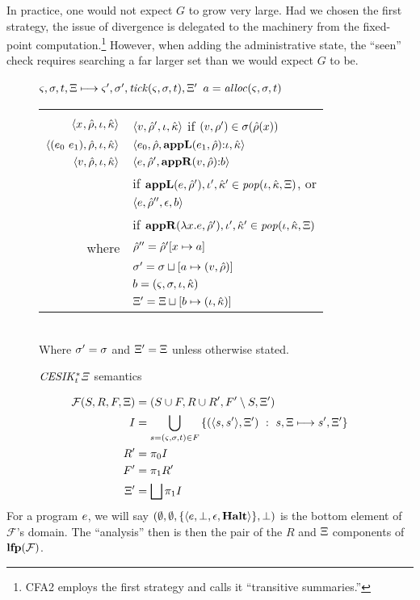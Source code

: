 In practice, one would not expect $G$ to grow very large.
%
Had we chosen the first strategy, the issue of divergence is delegated to the machinery from the fixed-point computation.\footnote{CFA2 employs the first strategy and calls it ``transitive summaries.''}
%
However, when adding the administrative state, the ``seen'' check requires searching a far larger set than we would expect $G$ to be.

\begin{figure}
  \centering
  $\varsigma,\sigma,t,\Xi \longmapsto \varsigma',\sigma',\mathit{tick}(\varsigma,\sigma,t),\Xi'$ \quad $a = \mathit{alloc}(\varsigma,\sigma,t)$ \\
  \begin{tabular}{r|l}
    \hline\vspace{-3mm}\\
    $\langle x^{{}}, \hat{\rho}, \iota, \hat{\kappa} \rangle$
    &
    $\langle v, \hat{\rho}',\iota,\hat{\kappa} \rangle$ if $(v,\rho') \in \sigma(\hat{\rho}(x))$
    \\
    $\langle (e_{0}\ e_{1}){},\hat{\rho},\iota,\hat{\kappa} \rangle$
    &
    $\langle e_{0},\hat{\rho},\mathbf{appL}(e_{1},\hat{\rho}){\tt :} \iota,\hat{\kappa} \rangle$
    \\
    $\langle v,\hat{\rho}, \iota,\hat{\kappa} \rangle$
    &
    $\langle e,\hat{\rho}',\mathbf{appR}(v,\hat{\rho}){\tt :} b \rangle$ \\
    &
    if $\mathbf{appL}(e,\hat{\rho}'), \iota',\hat{\kappa}' \in \mathit{pop}(\iota,\hat{\kappa},\Xi)$, or \\
    &
    $\langle e,\hat{\rho}'',\epsilon,b \rangle$ \\
    & if $\mathbf{appR}(\lambda{} x. e,\hat{\rho}'), \iota', \hat{\kappa}' \in \mathit{pop}(\iota,\hat{\kappa},\Xi)$ \\
    where & $\hat{\rho}'' = \hat{\rho}'[x\mapsto a]$ \\
    & $\sigma' = \sigma\sqcup[a \mapsto (v,\hat{\rho})]$ \\
    & $b = (\varsigma,\sigma,\iota,\hat{\kappa})$ \\
    & $\Xi' = \Xi\sqcup[b \mapsto (\iota,\hat{\kappa})]$
  \end{tabular} \\
  Where $\sigma' = \sigma$ and $\Xi' = \Xi$ unless otherwise stated.
  \caption{$\mathit{CESIK^*_t\Xi}$ semantics}
  \label{fig:cesikkstart-semantics}
\end{figure}

\begin{align*}
  {\mathcal F}(S,R,F,\Xi) &= (S \cup F, R \cup R', F'\setminus S, \Xi') \\
  I &= \bigcup\limits_{s=(\varsigma,\sigma,t) \in F}{\{ (\langle s,s' \rangle, \Xi')\ :\ s,\Xi \longmapsto s',\Xi'\}} \\
  R' &= \pi_0 I \\
  F' &= \pi_1 R' \\
  \Xi' &= \bigsqcup\pi_1 I
\end{align*}
For a program $e$, we will say $(\emptyset,\emptyset,\{ \langle e,\bot,\epsilon,\mathbf{Halt} \rangle \},\bot)$ is the bottom element of ${\mathcal F}$'s domain.
%
The ``analysis'' then is then the pair of the $R$ and $\Xi$ components of $\mathbf{lfp}({\mathcal F})$.

\begin{theorem}[Correctness]
\end{theorem}